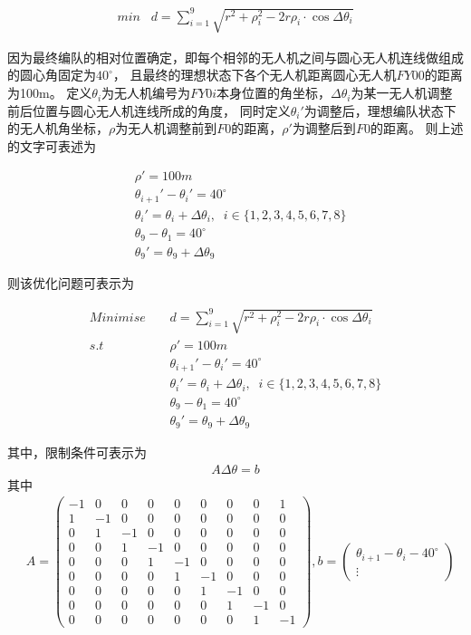\documentclass{ctexart}
\def\t{\theta}
\def\sn{\sum_{i=1}^9}
\def\d{\Delta}
\begin{document}
	\begin{align*}
		min \;\;\; d=\sn \sqrt{r^2 +\rho_i ^2 -2r\rho_i \cdot \cos\d\t_i }
	\end{align*}

	\par
	因为最终编队的相对位置确定，即每个相邻的无人机之间与圆心无人机连线做组成的圆心角固定为$40^\circ$，
	且最终的理想状态下各个无人机距离圆心无人机$FY00$的距离为100m。
	定义$\t_i$为无人机编号为$FY0i$本身位置的角坐标，$\Delta\t_i$为某一无人机调整前后位置与圆心无人机连线所成的角度，
	同时定义$\t_i'$为调整后，理想编队状态下的无人机角坐标，$\rho$为无人机调整前到$F0$的距离，$\rho'$为调整后到$F0$的距离。
	则上述的文字可表述为
	
	\begin{align*}
		&\rho' = 100m\\
		&\t_{i+1}'-\t_{i}'=40^\circ\\
		&\t_i' = \t_i + \Delta\t_i,\;\; i \in \{1,2,3,4,5,6,7,8\}\\
		&\t_9-\t_1=40^\circ \\
		&\t_9' = \t_9 + \Delta\t_9
	\end{align*}

	则该优化问题可表示为

	\begin{align*}
		Minimise \;\;\;\; &d=\sn \sqrt{r^2 +\rho_i ^2 -2r\rho_i \cdot \cos\d\t_i }\\
		s.t \;\;\;\;&\rho' = 100m\\
		&\t_{i+1}'-\t_{i}'=40^\circ\\
		&\t_i' = \t_i + \Delta\t_i,\;\; i \in \{1,2,3,4,5,6,7,8\}\\
		&\t_9-\t_1=40^\circ \\
		&\t_9' = \t_9 + \Delta\t_9
	\end{align*}

	其中，限制条件可表示为
	\begin{align*}
		A\Delta\t=b
	\end{align*}
	其中
	\begin{align*}
		&A=\begin{pmatrix}
			-1 & 0&0&0&0&0&0&0&1\\
			1&-1&0&0&0&0&0&0&0\\
			0&1&-1&0&0&0&0&0&0\\
			0&0&1&-1&0&0&0&0&0\\
			0&0&0&1&-1&0&0&0&0\\
			0&0&0&0&1&-1&0&0&0\\
			0&0&0&0&0&1&-1&0&0\\
			0&0&0&0&0&0&1&-1&0\\
			0&0&0&0&0&0&0&1&-1
		\end{pmatrix},b=\begin{pmatrix}
				\t_{i+1}-\t_i-40^\circ\\
				\vdots
					\end{pmatrix}
	\end{align*}
\end{document}
